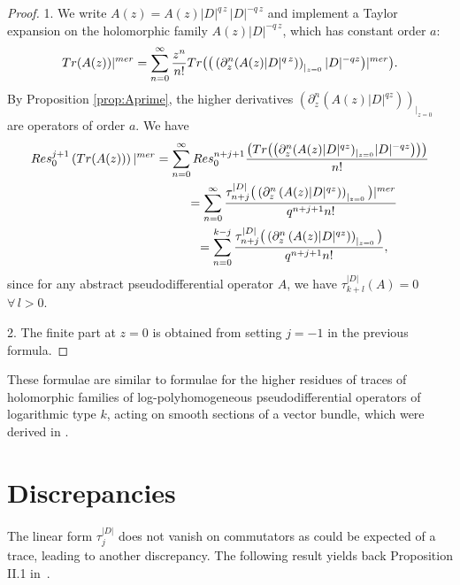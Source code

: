 \documentclass[11pt]{article}
\numberwithin{equation}{section}
\begin{document}
\begin{proof}
1. We write $A(z)= A(z) \vert D\vert^{q\, z}\, \vert D\vert^{-q\, z}$ and implement
   a Taylor expansion on the holomorphic family $A(z) \vert
   D\vert^{-
q\, z}$, which has constant order $a$:
\[
{\rm Tr}(A(z))\vert^{\rm mer}= \sum_{n=0}^\infty \frac{z^n}{n!}  {\rm Tr}\big(\big(\left(\partial_z^n (A(z)
    \vert D\vert^{q\, z})\right)_{\vert_{z=0}} \vert D\vert^{-q
    z}\big)\vert^{\rm mer}\big).
    \]
By Proposition \ref{prop:Aprime}, the higher derivatives $\left(\partial_z^n
(A(z)  \vert D\vert^{q  z})\right)_{\vert_{z=0}}$ are operators of order $a$. We have
\begin{gather*}
{\rm Res}^{j+1}_{0}\left( {\rm Tr}(A(z))\right)\vert^{\rm mer} =  \sum_{n=0}^\infty {\rm Res}_0^{n+j+1} \frac{
\big( {\rm Tr}\big(\big(\partial_z^n  (A(z)
    \vert D\vert^{q z} )_{\vert_{z=0}}  \vert D\vert^{-q  z}\big)\big)\big)}{n!}\\
    \phantom{{\rm Res}^{j+1}_{0}\left( {\rm Tr}(A(z))\right)\vert^{\rm mer}}{}
 =  \sum_{n=0}^\infty\frac{ \tau^{\vert D\vert}_{n+j}
\big(\left(\partial_z^n \left(A(z) \vert D\vert^{q  z}\right)\right)_{\vert_{z=0}}\big)\vert^{\rm mer}}{q^{n+j+1}  n!}\\
\phantom{{\rm Res}^{j+1}_{0}\left( {\rm Tr}(A(z))\right)\vert^{\rm mer}}{}
 =  \sum_{n=0}^{k-j}\frac{ \tau^{\vert D\vert}_{n+j}\big(\left(\partial_z^n \left(A(z) \vert D\vert^{q  z}\right)\right)_{\vert_{z=0}}\big)}{q^{n+j+1}  n!},
\end{gather*}
since  for any abstract pseudodif\/ferential operator $A$, we have $\tau_{k+l}^{\vert D\vert}(A)=0$ $\forall\, l>0$.

2. The f\/inite part at $z=0$ is obtained from setting $j=-1$ in the
  previous formula.
\end{proof}
\begin{remark} These formulae are similar to formulae for the higher
  residues of traces of holomorphic families of log-polyhomogeneous
  pseudodif\/ferential operators of logarithmic type $k$,   acting on smooth sections of
a vector bundle, which were derived in \cite{L}.
\end{remark}


\section{Discrepancies}\label{section6}
\setcounter{section}{6}
\setcounter{subsection}{0}
\setcounter{subsubsection}{0}
\setcounter{equation}{2}
\setcounter{proposition}{4}
\setcounter{footnote}{7}
The linear form $\tau_j^{\vert D\vert}$ does not vanish on commutators as could
be expected of a trace, leading to another discrepancy. The following result yields back  Proposition II.1 in~\cite{CoMo}.
\end{document}
